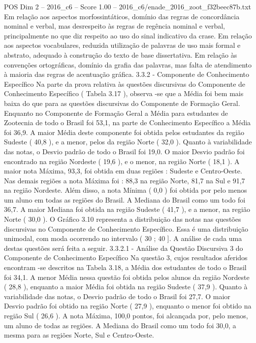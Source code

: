 \begin{textsample}{POS Dim 2 – 2016\_c6 – Score 1.00 – 2016\_c6/enade\_2016\_zoot\_f32beec87b.txt}
Em relação aos aspectos morfossintáticos, domínio das regras de concordância nominal e verbal, mas desrespeito às regras de regência nominal e verbal, principalmente no que diz respeito ao uso do sinal indicativo da crase.
Em relação aos aspectos vocabulares, reduzida utilização de palavras de uso mais formal e abstrato, adequado à construção do texto de base dissertativa.
Em relação às convenções ortográficas, domínio da grafia das palavras, mas falta de atendimento à maioria das regras de acentuação gráfica. 3.3.2 - Componente de Conhecimento Específico Na parte da prova relativa às questões discursivas do Componente de Conhecimento Específico ( Tabela 3.17 ), observa -se que a Média foi bem mais baixa do que para as questões discursivas do Componente de Formação Geral.
Enquanto no Componente de Formação Geral a Média para estudantes de Zootecnia de todo o Brasil foi 53,1, na parte de Conhecimento Específico a Média foi 36,9.
A maior Média deste componente foi obtida pelos estudantes da região Sudeste ( 40,8 ), e a menor, pelos da região Norte ( 32,0 ).
Quanto à variabilidade das notas, o Desvio padrão de todo o Brasil foi 19,0.
O maior Desvio padrão foi encontrado na região Nordeste ( 19,6 ), e o menor, na região Norte ( 18,1 ).
A maior nota Máxima, 93,3, foi obtida em duas regiões : Sudeste e Centro-Oeste.
Nas demais regiões a nota Máxima foi : 88,3 na região Norte, 81,7 na Sul e 91,7 na região Nordeste.
Além disso, a nota Mínima ( 0,0 ) foi obtida por pelo menos um aluno em todas as regiões do Brasil.
A Mediana do Brasil como um todo foi 36,7.
A maior Mediana foi obtida na região Sudeste ( 41,7 ), e a menor, na região Norte ( 30,0 ).
O Gráfico 3.10 representa a distribuição das notas nas questões discursivas no Componente de Conhecimento Específico.
Essa é uma distribuição unimodal, com moda ocorrendo no intervalo ( 30 ; 40 ].
A análise de cada uma destas questões será feita a seguir. 3.3.2.1 - Análise da Questão Discursiva 3 do Componente de Conhecimento Específico Na questão 3, cujos resultados aferidos encontram -se descritos na Tabela 3.18, a Média dos estudantes de todo o Brasil foi 34,1.
A menor Média nessa questão foi obtida pelos alunos da região Nordeste ( 28,8 ), enquanto a maior Média foi obtida na região Sudeste ( 37,9 ).
Quanto à variabilidade das notas, o Desvio padrão de todo o Brasil foi 27,7.
O maior Desvio padrão foi obtido na região Norte ( 27,9 ), enquanto o menor foi obtido na região Sul ( 26,6 ).
A nota Máxima, 100,0 pontos, foi alcançada por, pelo menos, um aluno de todas as regiões.
A Mediana do Brasil como um todo foi 30,0, a mesma para as regiões Norte, Sul e Centro-Oeste.

\end{textsample}
